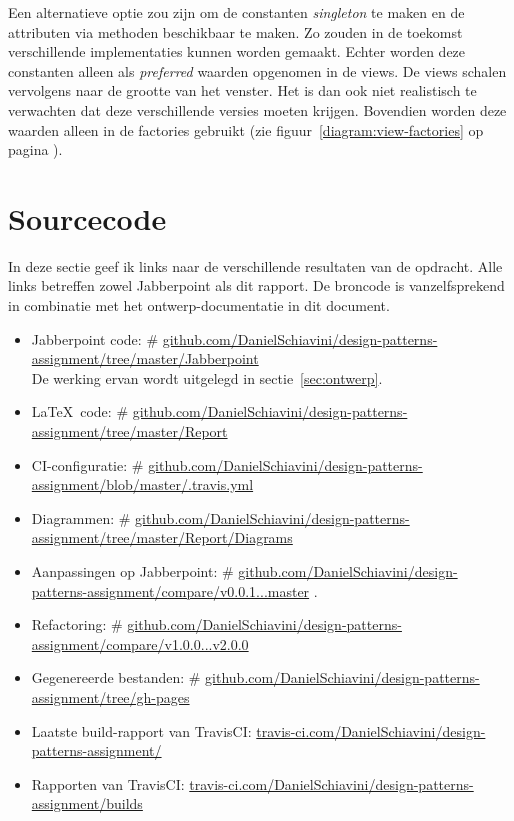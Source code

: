 \documentclass[a4paper]{article}
\makeatletter
\newcommand*{\repo}{\begingroup\@makeother\#\@repo}
\newcommand*{\@repo}[2]{%
  \href{https://github.com/DanielSchiavini/design-patterns-assignment/#1}{#2}%
  \endgroup}
\newcommand{\repolink}[1]{\repo{#1}{github.com\-/Daniel\-Schiavini\-/de\-sign-\-pat\-terns-\-as\-sign\-ment\-/#1}}
\newcommand{\cilink}[1]{\href{https://travis-ci.com/DanielSchiavini/design-patterns-assignment/#1}{travis-ci.com/DanielSchiavini/design-patterns-assignment/#1}}
\makeatother
\begin{document}
		Een alternatieve optie zou zijn om de constanten \textit{singleton} te maken en de attributen via methoden beschikbaar te maken.
		Zo zouden in de toekomst verschillende implementaties kunnen worden gemaakt.
		Echter worden deze constanten alleen als \textit{preferred} waarden opgenomen in de views.
		De views schalen vervolgens naar de grootte van het venster.
		Het is dan ook niet realistisch te verwachten dat deze verschillende versies moeten krijgen.
		Bovendien worden deze waarden alleen in de factories gebruikt (zie figuur~\ref{diagram:view-factories} op pagina \pageref{diagram:view-factories}).

\section{Sourcecode}\label{sec:source}
	In deze sectie geef ik links naar de verschillende resultaten van de opdracht.
	Alle links betreffen zowel Jabberpoint als dit rapport.
	De broncode is vanzelfsprekend in combinatie met het ontwerp-documentatie in dit document.
	\begin{itemize}
		\item Jabberpoint code:
			\repolink{tree/master/Jabberpoint}\\
			De werking ervan wordt uitgelegd in sectie~\ref{sec:ontwerp}.
		\item \LaTeX ~code:
			\repo{tree/master/Report}{github.com/DanielSchiavini/design-patterns-assignment\-/tree\-/master\-/Report}
		\item CI-configuratie:
			\repolink{blob/master/.travis.yml}
		\item Diagrammen:
			\repo{tree/master/Report/Diagrams}{github.com/DanielSchiavini/design-patterns-assignment\-/tree\-/master\-/Report\-/Diagrams}
		\item Aanpassingen op Jabberpoint:
			\repolink{compare/v0.0.1...master}.
		\item Refactoring:
			\repo{compare/v1.0.0...v2.0.0}{github.com/DanielSchiavini/design-patterns-assignment\-/com\-pare\-/v1.0.0...v2.0.0}
		\item Gegenereerde bestanden:
			\repolink{tree/gh-pages}
		\item Laatste build-rapport van TravisCI:
			\cilink{}
		\item Rapporten van TravisCI:
			\cilink{builds}
	\end{itemize}
\end{document}
